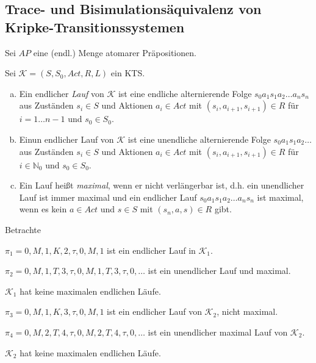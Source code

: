 \subsection{Trace- und Bisimulationsäquivalenz von Kripke-Transitionssystemen}
Sei $AP$ eine (endl.) Menge atomarer Präpositionen.

\begin{defn}[Läufe]
	Sei $\mathcal{K} = (S, S_0, \textit{Act}, R, L)$ ein KTS.
	\begin{enumerate}[a)]
		\item Ein endlicher \emph{Lauf} von $\mathcal{K}$ ist eine endliche alternierende Folge $s_0 a_1 s_1 a_2 \dots a_n s_n$ aus Zuständen $s_i \in S$ und Aktionen $a_i \in \textit{Act}$ mit $(s_i,a_{i+1}, s_{i+1}) \in R$ für $i=1 \dots n-1$ und $s_0 \in S_0$.
		
		\item Einun endlicher Lauf von $\mathcal{K}$ ist eine unendliche alternierende Folge $s_0 a_1 s_1 a_2 \dots$ aus Zuständen $s_i \in S$ und Aktionen $a_i \in \textit{Act}$ mit $(s_i,a_{i+1}, s_{i+1}) \in R$ für $i \in \mathbb{N}_0$ und $s_0 \in S_0$.
		
		\item Ein Lauf heißt \emph{maximal}, wenn er nicht verlängerbar ist, d.h. ein unendlicher Lauf ist immer maximal und ein endlicher Lauf $s_0 a_1 s_1 a_2 \dots a_n s_n$ ist maximal, wenn es kein $a \in \textit{Act}$ und $s \in S$ mit $(s_n, a, s) \in R$ gibt.
	\end{enumerate}
\end{defn}

\begin{bsp}
	\label{kts-aeq}
	Betrachte
	
	
	$\pi_1 = 0, M, 1, K, 2, \tau, 0, M, 1$ ist ein endlicher Lauf in $\mathcal{K}_1$.
	
	$\pi_2 = 0, M, 1, T, 3, \tau, 0, M, 1, T, 3, \tau, 0, \dots$ ist ein unendlicher Lauf und maximal.
	
	$\mathcal{K}_1$ hat keine maximalen endlichen Läufe.
	
	
	$\pi_3 = 0, M, 1, K, 3, \tau, 0, M, 1$ ist ein endlicher Lauf von $\mathcal{K}_2$, nicht maximal.
	
	$\pi_4 = 0, M, 2, T, 4, \tau, 0, M, 2, T, 4, \tau, 0, \dots$ ist ein unendlicher maximal Lauf von $\mathcal{K}_2$.
	
	$\mathcal{K}_2$ hat keine maximalen endlichen Läufe.
\end{bsp}

